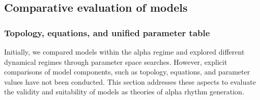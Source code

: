 \documentclass[12pt,twoside]{article}
\begin{document}
\subsection{Comparative evaluation of models}
\vspace{-0.15cm}

\subsubsection{Topology, equations, and unified parameter table}

\vspace{-0.15cm}

Initially, we compared models within the alpha regime and explored different dynamical regimes through parameter space searches. However, explicit comparisons of model components, such as topology, equations, and parameter values have not been conducted. This section addresses these aspects to evaluate the validity and suitability of models as theories of alpha rhythm generation. 
\vspace{-0.1cm}


\end{document}
